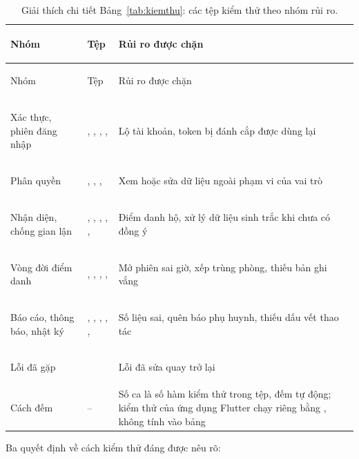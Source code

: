 {\footnotesize
\begin{xltabular}{\textwidth}{@{}>{\bfseries\raggedright\arraybackslash\leavevmode}p{2.6cm} >{\raggedright\arraybackslash\leavevmode}p{6.4cm} >{\raggedright\arraybackslash\leavevmode}X@{}}
\caption{Giải thích chi tiết Bảng~\ref{tab:kiemthu}: các tệp kiểm thử theo nhóm rủi ro.}
\label{tab:kiemthu-gt}\\
\toprule
Nhóm & Tệp & Rủi ro được chặn \\
\midrule
\endfirsthead
\toprule
Nhóm & Tệp & Rủi ro được chặn \\
\midrule
\endhead
\bottomrule
\endfoot
Xác thực, phiên đăng nhập & , , , ,  & Lộ tài khoản, token bị đánh cắp được dùng lại \\
Phân quyền & , , ,  & Xem hoặc sửa dữ liệu ngoài phạm vi của vai trò \\
Nhận diện, chống gian lận & , , , , ,  & Điểm danh hộ, xử lý dữ liệu sinh trắc khi chưa có đồng ý \\
Vòng đời điểm danh & , , , ,  & Mở phiên sai giờ, xếp trùng phòng, thiếu bản ghi vắng \\
Báo cáo, thông báo, nhật ký & , , , , ,  & Số liệu sai, quên báo phụ huynh, thiếu dấu vết thao tác \\
Lỗi đã gặp &  & Lỗi đã sửa quay trở lại \\
Cách đếm & -- & Số ca là số hàm kiểm thử trong tệp, đếm tự động; kiểm thử của ứng dụng Flutter chạy riêng bằng , không tính vào bảng \\
\end{xltabular}}

Ba quyết định về cách kiểm thử đáng được nêu rõ:

